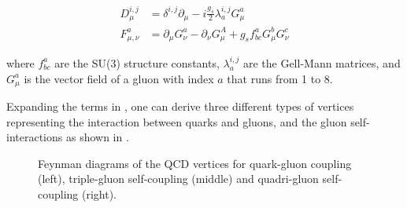 \begin{equation}
  \begin{split}
    D_{\mu}^{i,j}   &= \delta^{i,j}\partial_{\mu} - i\frac{g_{s}}{2}\lambda_{a}^{i,j}G^{a}_{\mu} \\
    F^{a}_{\mu,\nu} &= \partial_{\mu}G_{\nu}^{a}-\partial_{\nu}G_{\mu}^{A}+g_{s}f^{a}_{bc}G^{b}_{\mu}G^{c}_{\nu}
  \end{split}
\end{equation}

where $f^{a}_{bc}$ are the SU(3) structure constants, $\lambda_{a}^{i,j}$ are the Gell-Mann matrices, and $G^{a}_{\mu}$ is the vector field of a gluon with index $a$ that runs from 1 to 8.

Expanding the terms in , one can derive three different types of vertices representing the interaction between quarks and gluons, and the gluon self-interactions as shown in .

\begin{figure}[!htb]
  \vspace{10mm}
  \centering
  \hspace*{1cm}
  \hspace*{1cm}
  \caption{Feynman diagrams of the QCD vertices for quark-gluon coupling (left), triple-gluon self-coupling (middle) and quadri-gluon self-coupling (right).}
  \label{dia:QCDVertices}
\end{figure}

